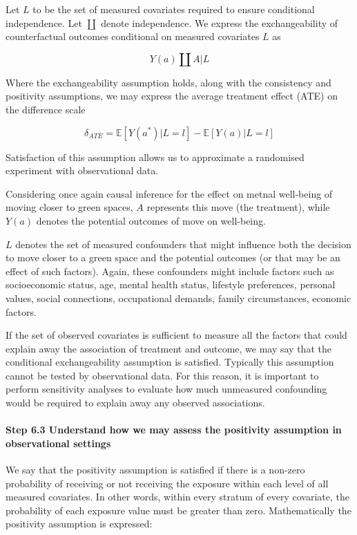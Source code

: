 \documentclass[
  singlecolumn]{article}
\let\oldparagraph\paragraph
\renewcommand{\paragraph}[1]{\oldparagraph{#1}\mbox{}}
\begin{document}
Let \(L\) to be the set of measured covariates required to ensure
conditional independence. Let \(\coprod\) denote independence. We
express the exchangeability of counterfactual outcomes conditional on
measured covariates \(L\) as

\[
Y(a) \coprod  A|L
\]

Where the exchangeability assumption holds, along with the consistency
and positivity assumptions, we may express the average treatment effect
(ATE) on the difference scale

\[
\delta_{ATE}  = \mathbb{E}[Y(a^*)|L = l] - \mathbb{E}[Y(a)|L = l]
\]

Satisfaction of this assumption allows us to approximate a randomised
experiment with observational data.

Considering once again causal inference for the effect on metnal
well-being of moving closer to green spaces, \(A\) represents this move
(the treatment), while \(Y(a)\) denotes the potential outcomes of move
on well-being.

\(L\) denotes the set of measured confounders that might influence both
the decision to move closer to a green space and the potential outcomes
(or that may be an effect of such factors). Again, these confounders
might include factors such as socioeconomic status, age, mental health
status, lifestyle preferences, personal values, social connections,
occupational demands, family circumstances, economic factors.

If the set of observed covariates is sufficient to measure all the
factors that could explain away the association of treatment and
outcome, we may say that the conditional exchangeability assumption is
satisfied. Typically this assumption cannot be tested by observational
data. For this reason, it is important to perform sensitivity analyses
to evaluate how much unmeasured confounding would be required to explain
away any observed associations.

\paragraph{\texorpdfstring{\textbf{Step 6.3 Understand how we may assess
the positivity assumption in observational
settings}}{Step 6.3 Understand how we may assess the positivity assumption in observational settings}}\label{step-6.3-understand-how-we-may-assess-the-positivity-assumption-in-observational-settings}

We say that the positivity assumption is satisfied if there is a
non-zero probability of receiving or not receiving the exposure within
each level of all measured covariates. In other words, within every
stratum of every covariate, the probability of each exposure value must
be greater than zero. Mathematically the positivity assumption is
expressed:
\end{document}
